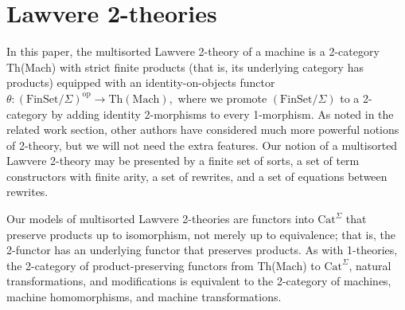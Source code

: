 \documentclass{article}
\newcommand{\maps}{\colon}
\newcommand{\FinSet}{\mathrm{FinSet}}
\newcommand{\Cat}{\mathrm{Cat}}
\newcommand{\op}{\mathrm{op}}
\begin{document}
\section {Lawvere 2-theories}
In this paper, the multisorted Lawvere 2-theory of a machine is a 2-category Th(Mach) with strict finite products (that is, its underlying category has products) equipped with an identity-on-objects functor $\theta\maps (\FinSet/\Sigma)^\op \to \mathrm{Th(Mach)},$ where we promote $(\FinSet/\Sigma)$ to a 2-category by adding identity 2-morphisms to every 1-morphism.  As noted in the related work section, other authors have considered much more powerful notions of 2-theory, but we will not need the extra features.  Our notion of a multisorted Lawvere 2-theory may be presented by a finite set of sorts, a set of term constructors with finite arity, a set of rewrites, and a set of equations between rewrites.  

Our models of multisorted Lawvere 2-theories are functors into $\Cat^\Sigma$ that preserve products up to isomorphism, not merely up to equivalence; that is, the 2-functor has an underlying functor that preserves products.  As with 1-theories, the 2-category of product-preserving functors from Th(Mach) to $\Cat^\Sigma$, natural transformations, and modifications is equivalent to the 2-category of machines, machine homomorphisms, and machine transformations.
\end{document}
